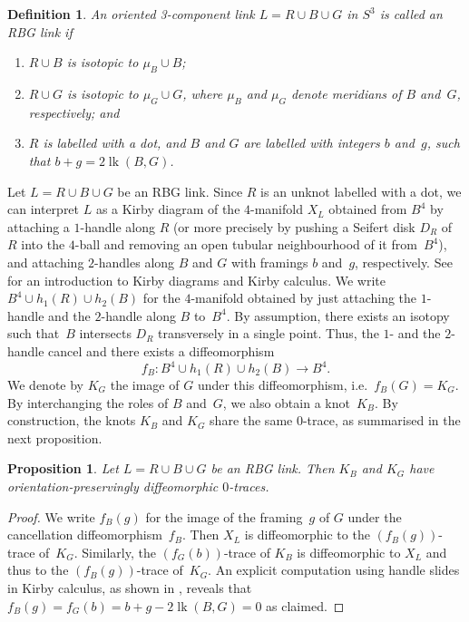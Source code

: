 \documentclass{amsart}
\newtheorem{prop}[theorem]{Proposition}
\newtheorem{definition}[theorem]{Definition}
\theoremstyle{remark}
\DeclareMathOperator{\lk}{lk}
\begin{document}
\begin{definition}
An oriented 3-component link $L=R\cup B\cup G$ in $S^3$ is called an \emph{RBG link} if
\begin{enumerate}[label=(\alph*)]
    \item $R\cup B$ is isotopic to $\mu_B\cup B$; 
    \item $R\cup G$ is isotopic to $\mu_G \cup G$,
    where $\mu_B$ and $\mu_G$ denote meridians of $B$ and~$G$, respectively; and
    \item $R$ is labelled with a dot, and $B$ and $G$ are labelled with integers $b$ and~$g$, such that $b+g=2\lk(B,G)$.  
\end{enumerate}
\end{definition}

Let $L=R\cup B\cup G$ be an RBG link. Since $R$ is an unknot labelled with a dot, we can interpret $L$ as a Kirby diagram of the $4$-manifold $X_L$ obtained from $B^4$ by attaching a $1$-handle along $R$ (or more precisely by pushing a Seifert disk $D_R$ of $R$ into the $4$-ball and removing an open tubular neighbourhood of it from~$B^4$), and attaching $2$-handles along $B$ and $G$ with framings $b$ and~$g$, respectively. See~\cite[Chapters~4 and~5]{gompf-stipsicz:book} for an introduction to Kirby diagrams and Kirby calculus.
We write $B^4\cup h_1(R)\cup h_2(B)$ for the $4$-manifold obtained by just attaching the $1$-handle and the $2$-handle along $B$ to~$B^4$. By assumption, there exists an isotopy such that~$B$ intersects $D_R$ transversely in a single point. Thus, the $1$- and the $2$-handle cancel and there exists a diffeomorphism 
$$f_B\colon B^4\cup h_1(R)\cup h_2(B)\rightarrow B^4.$$ 
We denote by $K_G$ the image of $G$ under this diffeomorphism, i.e.~$f_B(G)=K_G$. By interchanging the roles of $B$ and~$G$, we also obtain a knot~$K_B$.
By construction, the knots $K_B$ and $K_G$ share the same $0$-trace, as summarised in the next proposition.

\begin{prop}\label{thm:K_B_and_K_G}
Let $L=R\cup B\cup G$ be an RBG link. Then $K_B$ and $K_G$ have orientation-preservingly diffeomorphic $0$-traces.
\end{prop}

\begin{proof}
We write $f_B(g)$ for the image of the framing~$g$ of $G$ under the cancellation diffeomorphism~$f_B$. Then $X_L$ is diffeomorphic to the $(f_B(g))$-trace of~$K_G$. Similarly, the $(f_G(b))$-trace of $K_B$ is diffeomorphic to $X_L$ and thus to the $(f_B(g))$-trace of~$K_G$.
An explicit computation using handle slides in Kirby calculus, as shown in , reveals that $f_B(g)=f_G(b)=b+g-2 \lk(B,G)=0$ as claimed.
\end{proof}
\end{document}
